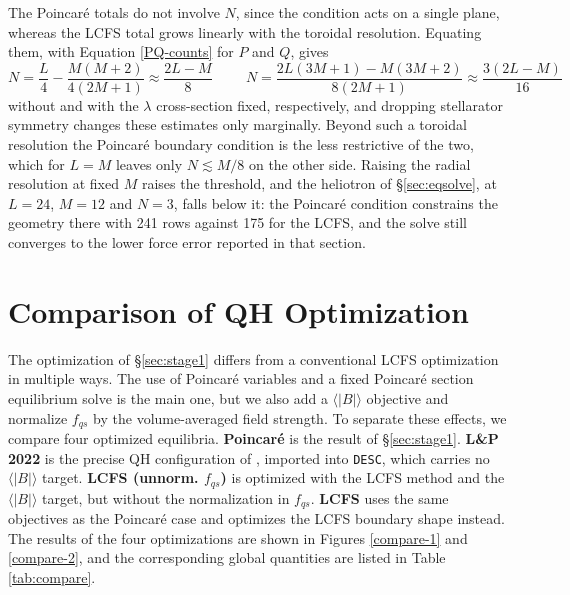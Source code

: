 \documentclass{jpp}
\begin{document}
The Poincaré totals do not involve $N$, since the condition acts on a single plane, whereas the LCFS total grows linearly with the toroidal resolution. Equating them, with Equation \ref{PQ-counts} for $P$ and $Q$, gives
\begin{equation}
    N = \frac{L}{4} - \frac{M(M+2)}{4(2M+1)} \approx \frac{2L-M}{8} \hspace{1cm} N = \frac{2L(3M+1) - M(3M+2)}{8(2M+1)} \approx \frac{3(2L-M)}{16}
\end{equation}
without and with the $\lambda$ cross-section fixed, respectively, and dropping stellarator symmetry changes these estimates only marginally. Beyond such a toroidal resolution the Poincaré boundary condition is the less restrictive of the two, which for $L=M$ leaves only $N\lesssim M/8$ on the other side. Raising the radial resolution at fixed $M$ raises the threshold, and the heliotron of \S\ref{sec:eqsolve}, at $L=24$, $M=12$ and $N=3$, falls below it: the Poincaré condition constrains the geometry there with 241 rows against 175 for the LCFS, and the solve still converges to the lower force error reported in that section.


\section{Comparison of QH Optimization}\label{app:comparison}
The optimization of \S\ref{sec:stage1} differs from a conventional LCFS optimization in multiple ways. The use of Poincaré variables and a fixed Poincaré section equilibrium solve is the main one, but we also add a $\langle |B| \rangle$ objective and normalize $f_{qs}$ by the volume-averaged field strength. To separate these effects, we compare four optimized equilibria. \textbf{Poincaré} is the result of \S\ref{sec:stage1}. \textbf{L\&P 2022} is the precise QH configuration of \cite{landremanMagneticFieldsPrecise2022}, imported into \texttt{DESC}, which carries no $\langle |B| \rangle$ target. \textbf{LCFS (unnorm. $f_{qs}$)} is optimized with the LCFS method and the $\langle |B| \rangle$ target, but without the normalization in $f_{qs}$. \textbf{LCFS} uses the same objectives as the Poincaré case and optimizes the LCFS boundary shape instead. The results of the four optimizations are shown in Figures \ref{compare-1} and \ref{compare-2}, and the corresponding global quantities are listed in Table \ref{tab:compare}.
\end{document}
